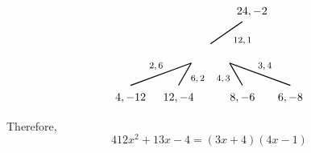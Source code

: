 \documentclass[11pt,letterpaper]{article}
\begin{document}
\[\begin{tikzpicture}
	\node at (1,0.4) {\footnotesize$12, 1$};
	\draw[line width=0.03cm] (0,0.3) -- (1,1);
	\node at (1.3,1.3) {$24, -2$};
	
	\node at (-1.7,-0.4) {\footnotesize$2, 6$};
	\draw[line width=0.03cm,label={1}] (-0.6,-0.3) -- (-2.5,-1);
	\node at (-2.5,-1.4) {$4, -12$};
	
	\node at (-0.4,-0.8) {\footnotesize$6, 2$};
	\draw[line width=0.03cm,label={1}] (-0.6,-0.3) -- (-1,-1);
	\node at (-1,-1.4) {$12, -4$};
	
	\node at (1.7,-0.4) {\footnotesize$3, 4$};
	\draw[line width=0.03cm,label={1}] (0.6,-0.3) -- (2.5,-1);
	\node at (2.5,-1.4) {$6, -8$};

	\node at (0.4,-0.8) {\footnotesize$4, 3$};
	\draw[line width=0.03cm,label={1}] (0.6,-0.3) -- (1,-1);
	\node at (1,-1.4) {$8, -6$};


	\end{tikzpicture}
	\]

Therefore, 
	\[
	412x^2 + 13x - 4= (3x + 4)(4x - 1)
	\]


\end{document}
